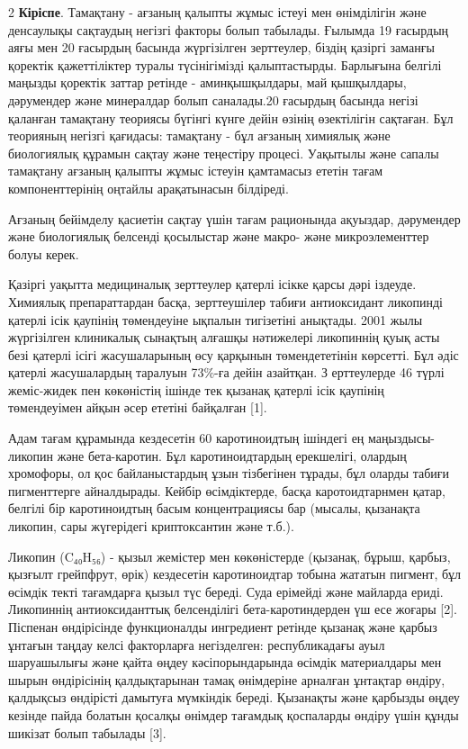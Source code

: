 \begin{multicols}{2}
{\bfseries Кіріспе}. Тамақтану - ағзаның қалыпты жұмыс істеуі мен
өнімділігін және денсаулықы сақтаудың негізгі факторы болып табылады.
Ғылымда 19 ғасырдың аяғы мен 20 ғасырдың басында жүргізілген зерттеулер,
біздің қазіргі заманғы қоректік қажеттіліктер туралы түсінігімізді
қалыптастырды. Барлығына белгілі маңызды қоректік заттар ретінде -
аминқышқылдары, май қышқылдары, дәрумендер және минералдар болып
саналады.20 ғасырдың басында негізі қаланған тамақтану теориясы бүгінгі
күнге дейін өзінің өзектілігін сақтаған. Бұл теорияның негізгі қағидасы:
тамақтану - бұл ағзаның химиялық және биологиялық құрамын сақтау және
теңестіру процесі. Уақытылы және сапалы тамақтану ағзаның қалыпты жұмыс
істеуін қамтамасыз ететін тағам компоненттерінің оңтайлы арақатынасын
білдіреді.

Ағзаның бейімделу қасиетін сақтау үшін тағам рационында ақуыздар,
дәрумендер және биологиялық белсенді қосылыстар және макро- және
микроэлементтер болуы керек.

Қазіргі уақытта медициналық зерттеулер қатерлі ісікке қарсы дәрі
іздеуде. Химиялық препараттардан басқа, зерттеушілер табиғи антиоксидант
ликопинді қатерлі ісік қаупінің төмендеуіне ықпалын тигізетіні анықтады.
2001 жылы жүргізілген клиникалық сынақтың алғашқы нәтижелері ликопиннің
қуық асты безі қатерлі ісігі жасушаларының өсу қарқынын төмендететінін
көрсетті. Бұл әдіс қатерлі жасушалардың таралуын 73\%-ға дейін азайтқан.
З ерттеулерде 46 түрлі жеміс-жидек пен көкөністің ішінде тек қызанақ
қатерлі ісік қаупінің төмендеуімен айқын әсер ететіні байқалған {[}1{]}.

Адам тағам құрамында кездесетін 60 каротиноидтың ішіндегі ең маңыздысы-
ликопин және бета-каротин. Бұл каротиноидтардың ерекшелігі, олардың
хромофоры, ол қос байланыстардың ұзын тізбегінен тұрады, бұл оларды
табиғи пигменттерге айналдырады. Кейбір өсімдіктерде, басқа
каротоидтарнмен қатар, белгілі бір каротиноидтың басым концентрациясы
бар (мысалы, қызанақта ликопин, сары жүгерідегі криптоксантин және
т.б.).

Ликопин (C₄₀H₅₆) - қызыл жемістер мен көкөністерде (қызанақ, бұрыш,
қарбыз, қызғылт грейпфрут, өрік) кездесетін каротиноидтар тобына жататын
пигмент, бұл өсімдік текті тағамдарға қызыл түс береді. Суда ерімейді
және майларда ериді. Ликопиннің антиоксиданттық белсенділігі
бета-каротиндерден үш есе жоғары {[}2{]}. Піспенан өндірісінде
функционалды ингредиент ретінде қызанақ және қарбыз ұнтағын таңдау келсі
факторларға негізделген: республикадағы ауыл шаруашылығы және қайта
өңдеу кәсіпорындарында өсімдік материалдары мен шырын өндірісінің
қалдықтарынан тамақ өнімдеріне арналған ұнтақтар өндіру, қалдықсыз
өндірісті дамытуға мүмкіндік береді. Қызанақты және қарбызды өңдеу
кезінде пайда болатын қосалқы өнімдер тағамдық қоспаларды өндіру үшін
құнды шикізат болып табылады {[}3{]}.


\end{multicols}
